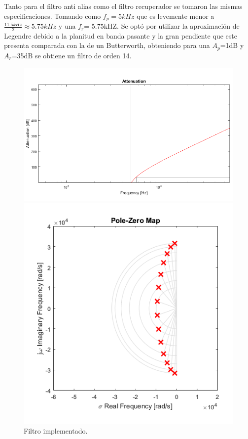 Tanto para el filtro anti alias como el filtro recuperador se tomaron las mismas especificaciones.
Tomando como $f_p= 5kHz$ que es levemente menor a $\frac{11.5kHz}{2}\approx 5.75kHz $ y una $f_r$= 5.75kHZ.
Se optó por utilizar la aproximación de Legendre debido a la planitud en banda pasante y la gran pendiente que este presenta comparada con la de un Butterworth, obteniendo para una $A_p$=1dB y $A_r$=35dB se obtiene un filtro de orden 14.
\begin{figure}[H]
\centering
\includegraphics[width=0.7\linewidth, page=1]{ImagenesEjercicio1/magnitude.png}

\includegraphics[width=0.5\linewidth, page=1]{ImagenesEjercicio1/pz.png}
\caption{Filtro implementado.}
\label{filtros}
\end{figure}

